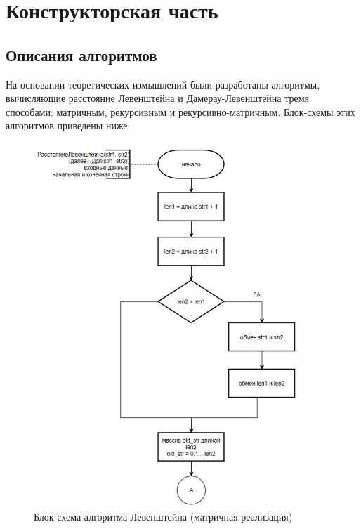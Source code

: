 \section{Конструкторская часть}
\subsection*{Описания алгоритмов}

\hspace{1.25cm}
На основании теоретических измышлений были разработаны алгоритмы, вычисляющие расстояние Левенштейна и Дамерау-Левенштейна тремя способами: матричным, рекурсивным и рекурсивно-матричным. Блок-схемы этих алгоритмов приведены ниже.

\begin{figure}[H]
    \centering
    \includegraphics[width=0.9\textwidth]{img/block_1_1_1.png}
    \caption{Блок-схема алгоритма Левенштейна (матричная реализация)}
\end{figure}

